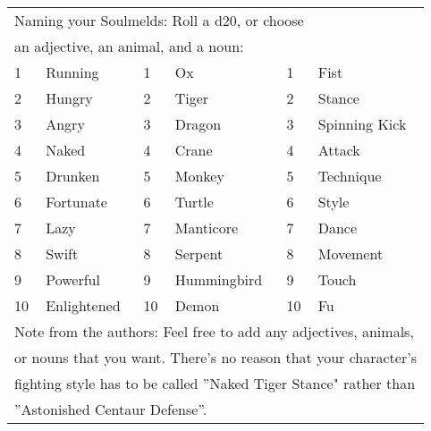 \begin{table}[tbh]
\begin{small}
\begin{center}
\noindent \begin{tabular}{|ll||ll||ll|}
\multicolumn{6}{l}{Naming your Soulmelds: Roll a d20, or choose}\\
\multicolumn{6}{l}{an adjective, an animal, and a noun:} \\
\hline 1&Running&1&Ox&1&Fist\\
2&Hungry&2&Tiger&2&Stance\\
3&Angry&3&Dragon&3&Spinning Kick\\
4&Naked&4&Crane&4&Attack\\
5&Drunken&5&Monkey&5&Technique\\
6&Fortunate&6&Turtle&6&Style\\
7&Lazy&7&Manticore&7&Dance\\
8&Swift&8&Serpent&8&Movement\\
9&Powerful&9&Hummingbird&9&Touch\\
10&Enlightened&10&Demon&10&Fu\\ \hline
\multicolumn{6}{l}{Note from the authors: Feel free to add any adjectives, animals,}\\
\multicolumn{6}{l}{or nouns that you want.  There's no reason that your character's}\\
\multicolumn{6}{l}{fighting style has to be called ''Naked Tiger Stance" rather than}\\
\multicolumn{6}{l}{''Astonished Centaur Defense''.}\\
\end{tabular}
\end{center}
\end{small}
\end{table}



